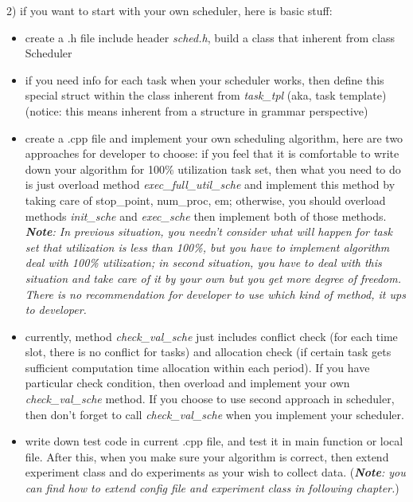 \documentclass[11pt, oneside]{article}
\begin{document}
2) if you want to start with your own scheduler, here is basic stuff: 
\begin{itemize}
\item create a .h file include header \textit{sched.h}, build a class that inherent from class Scheduler
\item if you need info for each task when your scheduler works, then define this special struct within the class inherent from \textit{task\_tpl} (aka, task template) (notice: this means inherent from a structure in grammar perspective)
\item create a .cpp file and implement your own scheduling algorithm, here are two approaches for developer to choose: if you feel that it is comfortable to write down your algorithm for 100\% utilization task set, then what you need to do is just overload method \textit{exec\_full\_util\_sche} and implement this method by taking care of stop\_point, num\_proc, em; otherwise, you should overload methods \textit{init\_sche} and \textit{exec\_sche} then implement both of those methods. \\
\footnotesize{\textit{\textbf{Note}: In previous situation, you needn't consider what will happen for task set that utilization is less than 100\%, but you have to implement algorithm deal with 100\% utilization; in second situation, you have to deal with this situation and take care of it by your own but you get more degree of freedom. There is no recommendation for developer to use which kind of method, it ups to developer.}}
\item currently, method \textit{check\_val\_sche} just includes conflict check (for each time slot, there is no conflict for tasks) and allocation check (if certain task gets sufficient computation time allocation within each period). If you have particular check condition, then overload and implement your own \textit{check\_val\_sche} method. If you choose to use second approach in scheduler, then don't forget to call \textit{check\_val\_sche} when you implement your scheduler.
\item write down test code in current .cpp file, and test it in main function or local file. After this, when you make sure your algorithm is correct, then extend experiment class and do experiments as your wish to collect data. (\footnotesize{\textit{\textbf{Note}: you can find how to extend config file and experiment class in following chapter.}})
\end{itemize}
\end{document}
